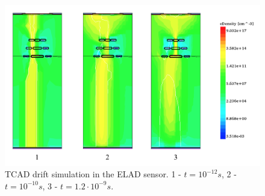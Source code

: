 \begin{figure}[!tb]
 \center
 \includegraphics[trim= 0 0 0 0, width=.65\linewidth]{pictures/drift2.png} 
 \caption[short description here]
 {TCAD drift simulation in the ELAD sensor. 1 - $t = 10^{-12} s$, 2 - $t = 10^{-10} s$, 3 - $t = 1.2 \cdot 10^{-9} s$. 
 }
 \label{fig:drift}
\end{figure}

